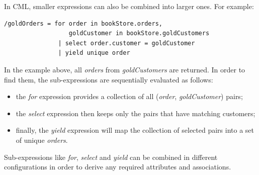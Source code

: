 In CML, smaller expressions can also be combined into larger ones. For example:
 
\verbatimfont{\scriptsize}
\begin{verbatim}
/goldOrders = for order in bookStore.orders,
                  goldCustomer in bookStore.goldCustomers
               | select order.customer = goldCustomer
               | yield unique order
 \end{verbatim}

In the example above, all \emph{orders} from \emph{goldCustomers} are returned.
In order to find them, the sub-expressions are sequentially evaluated as follows:

\begin{itemize}
\item the \emph{for} expression provides a collection of all (\emph{order}, \emph{goldCustomer}) pairs;
\item the \emph{select} expression then keeps only the pairs that have matching customers;
\item finally, the \emph{yield} expression will map the collection of selected pairs into a set of unique \emph{orders}.
\end{itemize}

Sub-expressions like \emph{for}, \emph{select} and \emph{yield} can be combined in different configurations
in order to derive any required attributes and associations.